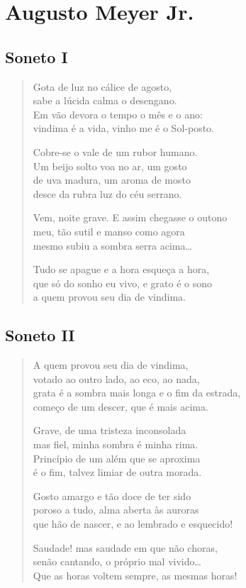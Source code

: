 \documentclass[10pt,a5paper,oneside]{book}
\begin{document}
\part{Augusto Meyer Jr.}

\chapter{Soneto I}

\begin{verse}
Gota de luz no cálice de agosto,\\
sabe a lúcida calma o desengano.\\
Em vão devora o tempo o mês e o ano:\\
vindima é a vida, vinho me é o Sol-posto.

Cobre-se o vale de um rubor humano.\\
Um beijo solto voa no ar, um gosto\\
de uva madura, um aroma de mosto\\
desce da rubra luz do céu serrano.

Vem, noite grave. E assim chegasse o outono\\
meu, tão sutil e manso como agora\\
mesmo subiu a sombra serra acima\ldots{}

Tudo se apague e a hora esqueça a hora,\\
que só do sonho eu vivo, e grato é o sono\\
a quem provou seu dia de vindima.
\end{verse}

\chapter{Soneto II}

\begin{verse}
A quem provou seu dia de vindima,\\
votado ao outro lado, ao eco, ao nada,\\
grata é a sombra mais longa e o fim da estrada,\\
começo de um descer, que é mais acima.

Grave, de uma tristeza inconsolada\\
mas fiel, minha sombra é minha rima.\\
Princípio de um além que se aproxima\\
é o fim, talvez limiar de outra morada.

Gosto amargo e tão doce de ter sido\\
poroso a tudo, alma aberta às auroras\\
que hão de nascer, e ao lembrado e esquecido!

Saudade! mas saudade em que não choras,\\
senão cantando, o próprio mal vivido\ldots{}\\
Que as horas voltem sempre, as mesmas horas!
\end{verse}
\end{document}
